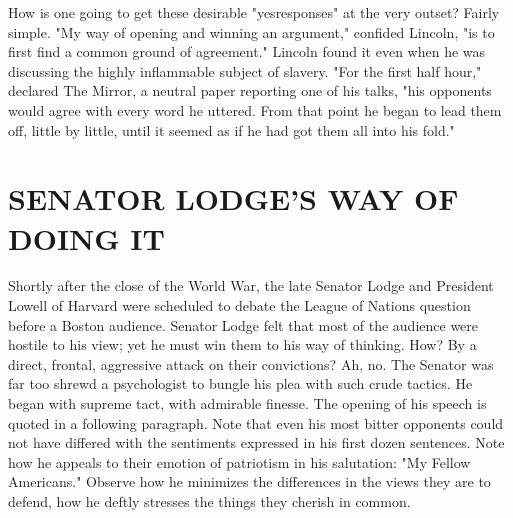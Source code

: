 \documentclass[10pt]{article}
\begin{document}
How is one going to get these desirable "yesresponses" at the very outset? Fairly simple. "My way of opening and winning an argument," confided Lincoln, "is to first find a common ground of agreement." Lincoln found it even when he was discussing the highly inflammable subject of slavery. "For the first half hour," declared The Mirror, a neutral paper reporting one of his talks, "his opponents would agree with every word he uttered. From that point he began to lead them off, little by little, until it seemed as if he had got them all into his fold."

\section*{SENATOR LODGE'S WAY OF DOING IT}
Shortly after the close of the World War, the late Senator Lodge and President Lowell of Harvard were scheduled to debate the League of Nations question before a Boston audience. Senator Lodge felt that most of the audience were hostile to his view; yet he must win them to his way of thinking. How? By a direct, frontal, aggressive attack on their convictions? Ah, no. The Senator was far too shrewd a psychologist to bungle his plea with such crude tactics. He began with supreme tact, with admirable finesse. The opening of his speech is quoted in a following paragraph. Note that even his most bitter opponents could not have differed with the sentiments expressed in his first dozen sentences. Note how he appeals to their emotion of patriotism in his salutation: "My Fellow Americans." Observe how he minimizes the differences in the views they are to\\
defend, how he deftly stresses the things they cherish in common.
\end{document}
